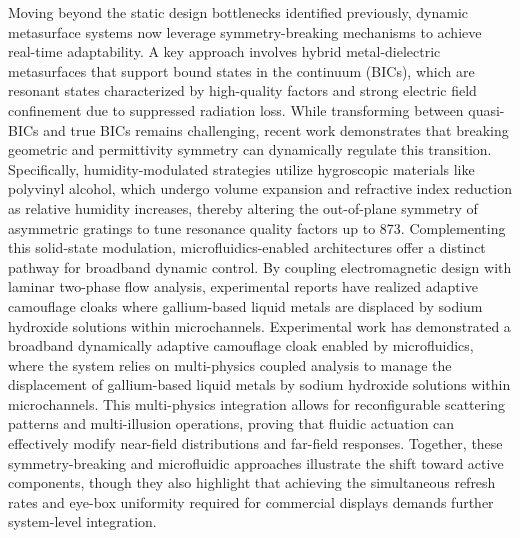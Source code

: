 \documentclass[11pt]{article}
\begin{document}
Moving beyond the static design bottlenecks identified previously, dynamic metasurface systems now leverage symmetry-breaking mechanisms to achieve real-time adaptability. A key approach involves hybrid metal-dielectric metasurfaces that support bound states in the continuum (BICs), which are resonant states characterized by high-quality factors and strong electric field confinement due to suppressed radiation loss. While transforming between quasi-BICs and true BICs remains challenging, recent work demonstrates that breaking geometric and permittivity symmetry can dynamically regulate this transition. Specifically, humidity-modulated strategies utilize hygroscopic materials like polyvinyl alcohol, which undergo volume expansion and refractive index reduction as relative humidity increases, thereby altering the out-of-plane symmetry of asymmetric gratings to tune resonance quality factors up to 873. \citep{doi_10_1002_adpr_202400191_88f03cd9} \citep{doi_10_1364_oe_574568_72469f3c} Complementing this solid-state modulation, microfluidics-enabled architectures offer a distinct pathway for broadband dynamic control. By coupling electromagnetic design with laminar two-phase flow analysis, experimental reports have realized adaptive camouflage cloaks where gallium-based liquid metals are displaced by sodium hydroxide solutions within microchannels. Experimental work has demonstrated a broadband dynamically adaptive camouflage cloak enabled by microfluidics, where the system relies on multi-physics coupled analysis to manage the displacement of gallium-based liquid metals by sodium hydroxide solutions within microchannels. \citep{doi_10_1002_lpor_202500327_a3bf6deb} This multi-physics integration allows for reconfigurable scattering patterns and multi-illusion operations, proving that fluidic actuation can effectively modify near-field distributions and far-field responses. Together, these symmetry-breaking and microfluidic approaches illustrate the shift toward active components, though they also highlight that achieving the simultaneous refresh rates and eye-box uniformity required for commercial displays demands further system-level integration. \citep{doi_10_1002_adpr_202400191_88f03cd9} \citep{doi_10_1002_lpor_202500327_a3bf6deb}
\end{document}
